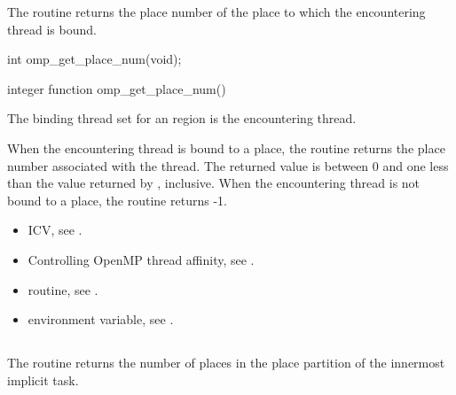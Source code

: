 \summary
The  routine returns the place number 
of the place to which the encountering thread is bound.

\format
\begin{ccppspecific}
\begin{ompcFunction}
int omp_get_place_num(void);
\end{ompcFunction}
\end{ccppspecific}

\begin{fortranspecific}
\begin{ompfFunction}
integer function omp_get_place_num()
\end{ompfFunction}
\end{fortranspecific}

\binding
The binding thread set for an  region is 
the encountering thread.

\effect
When the encountering thread is bound to a place, the
 routine returns the place number associated
with the thread. The returned value is between 0 and one less than the
value returned by , inclusive. When the
encountering thread is not bound to a place, the routine returns -1.

\crossreferences
\begin{itemize}
\item {} ICV, see
.

\item Controlling OpenMP thread affinity, see
.

\item {} routine, see
.

\item {} environment variable, see
.
\end{itemize}



\subsection{}
\label{subsec:omp_get_partition_num_places}

\summary
The  routine returns the number 
of places in the place partition of the innermost implicit task.

